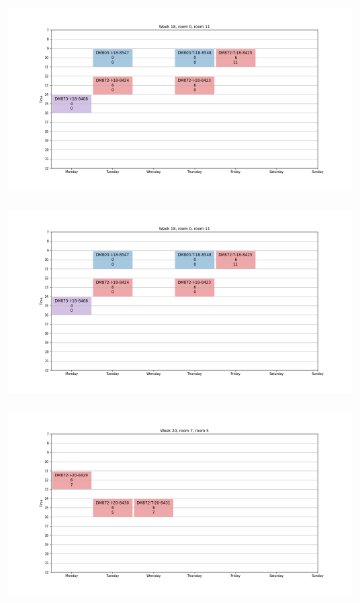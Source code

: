 \documentclass{article}
\begin{document}
\begin{figure}
\begin{subfigure}{.85\textwidth}
        \end{subfigure}%
        \begin{subfigure}{.85\textwidth}
            \centering
            \includegraphics[width=1.1\linewidth]{../images/week-18.png}
        \end{subfigure}
        \hspace*{-5cm}
        \begin{subfigure}{.85\textwidth}
            \centering
            \includegraphics[width=1.1\linewidth]{../images/week-18.png}
        \end{subfigure}%
        \begin{subfigure}{.85\textwidth}
            \centering
            \includegraphics[width=1.1\linewidth]{../images/week-20.png}

\end{subfigure}
\end{figure}
\end{document}
